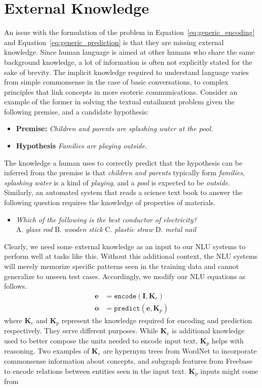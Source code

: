 \section{External Knowledge}
An issue with the formulation of the problem in Equation~\ref{eq:generic_encoding} and Equation~\ref{eq:generic_prediction} is that they are missing external knowledge. 
Since human language is aimed at other humans who share 
the same background knowledge, a lot of information is often not explicitly stated
for the sake of brevity. The implicit knowledge required to understand language varies 
from simple commonsense in the case of basic conversations, to complex principles that link 
concepts in more esoteric communications. Consider an example of the former in solving the 
textual entailment problem given the following premise, and a candidate hypothesis:
\begin{itemize}
 \item \textbf{Premise:} \textit{Children and parents are splashing water at the pool.}
 \item \textbf{Hypothesis} \textit{Families are playing outside.}
\end{itemize}
The knowledge a human uses to correctly predict that the hypothesis can be inferred from the 
premise is that \textit{children and parents} typically form \textit{families}, \textit{splashing water} 
is a kind of \textit{playing}, and a \textit{pool} is expected to be \textit{outside}. Similarly, an 
automated system that reads a science text book to answer the following 
question requires the knowledge of properties of materials.
\begin{itemize}
 \item \textit{Which of the following is the best conductor of electricity?}\\ 
  A. \textit{glass rod}  B. \textit{wooden stick}  C. \textit{plastic straw} D. \textit{metal nail}
\end{itemize}
Clearly, we need some external knowledge as an input to our NLU systems to perform well at tasks like this.
Without this additional context, the NLU systems will merely memorize specific patterns seen in the training data
and cannot generalize to unseen test cases. Accordingly, we modify our NLU equations as follows.
\begin{align}
 \mathbf{e} &= \mathtt{encode}(\mathbf{I}, \mathbf{K}_e) \label{eq:encoding_with_knowledge}\\
 \mathbf{o} &= \mathtt{predict}(\mathbf{e}, \mathbf{K}_p) \label{eq:prediction_with_knowledge}
\end{align}
where $\mathbf{K}_e$ and $\mathbf{K}_p$ represent the knowledge required for encoding and prediction respectively. 
They serve different purposes. While $\mathbf{K}_e$ is additional knowledge used to better compose the units needed to
encode input text, $\mathbf{K}_p$ helps with reasoning. Two examples of $\mathbf{K}_e$ are hypernym trees from WordNet to
incorporate commonsense information about concepts, and subgraph features from Freebase to encode relations
between entities seen in the input text. $\textbf{K}_p$ inputs might come from 

